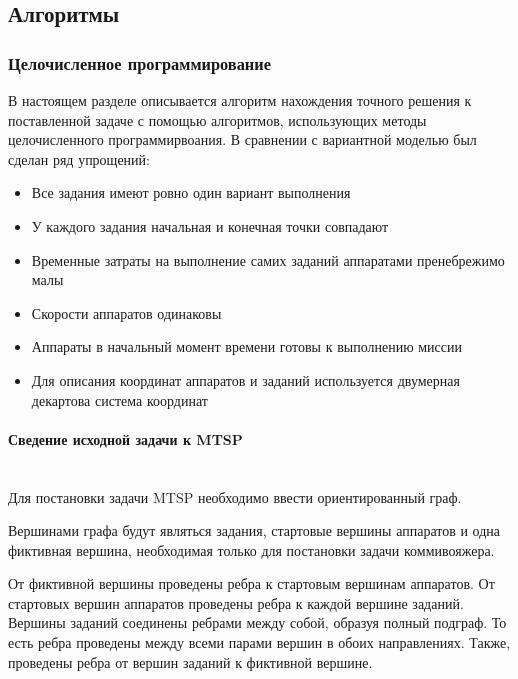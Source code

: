 \documentclass[a4paper,14pt,russian]{article}
\begin{document}
\subsection{Алгоритмы}
\subsubsection{Целочисленное программирование}

В настоящем разделе описывается алгоритм нахождения точного решения к поставленной задаче с помощью алгоритмов, использующих методы целочисленного программирвоания. В сравнении с вариантной моделью был сделан ряд упрощений:


\begin{itemize}
\item Все задания имеют ровно один вариант выполнения
\item У каждого задания начальная и конечная точки совпадают
\item Временные затраты на выполнение самих заданий аппаратами пренебрежимо малы
\item Скорости аппаратов одинаковы
\item Аппараты в начальный момент времени готовы к выполнению миссии
\item Для описания координат аппаратов и заданий используется двумерная декартова система координат
\end{itemize}


\paragraph{Сведение исходной задачи к MTSP} ~\\

Для постановки задачи MTSP необходимо ввести ориентированный граф.

Вершинами графа будут являться задания, стартовые вершины аппаратов и одна фиктивная вершина, необходимая только для постановки задачи коммивояжера.

От фиктивной вершины проведены ребра к стартовым вершинам аппаратов. От стартовых вершин аппаратов проведены ребра к каждой вершине заданий. Вершины заданий соединены ребрами между собой, образуя полный подграф. То есть ребра проведены между всеми парами вершин в обоих направлениях. Также, проведены ребра от вершин заданий к фиктивной вершине.
\end{document}

